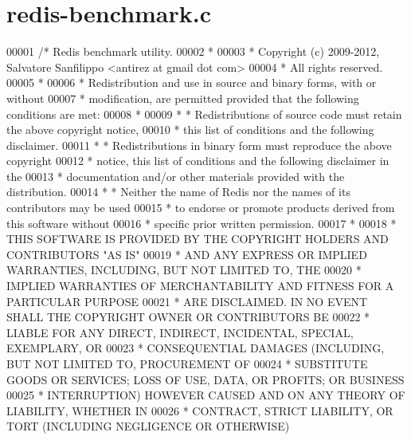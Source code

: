 \hypertarget{redis-benchmark_8c_source}{}\section{redis-\/benchmark.c}
\label{redis-benchmark_8c_source}

\begin{DoxyCode}
00001 \textcolor{comment}{/* Redis benchmark utility.}
00002 \textcolor{comment}{ *}
00003 \textcolor{comment}{ * Copyright (c) 2009-2012, Salvatore Sanfilippo <antirez at gmail dot com>}
00004 \textcolor{comment}{ * All rights reserved.}
00005 \textcolor{comment}{ *}
00006 \textcolor{comment}{ * Redistribution and use in source and binary forms, with or without}
00007 \textcolor{comment}{ * modification, are permitted provided that the following conditions are met:}
00008 \textcolor{comment}{ *}
00009 \textcolor{comment}{ *   * Redistributions of source code must retain the above copyright notice,}
00010 \textcolor{comment}{ *     this list of conditions and the following disclaimer.}
00011 \textcolor{comment}{ *   * Redistributions in binary form must reproduce the above copyright}
00012 \textcolor{comment}{ *     notice, this list of conditions and the following disclaimer in the}
00013 \textcolor{comment}{ *     documentation and/or other materials provided with the distribution.}
00014 \textcolor{comment}{ *   * Neither the name of Redis nor the names of its contributors may be used}
00015 \textcolor{comment}{ *     to endorse or promote products derived from this software without}
00016 \textcolor{comment}{ *     specific prior written permission.}
00017 \textcolor{comment}{ *}
00018 \textcolor{comment}{ * THIS SOFTWARE IS PROVIDED BY THE COPYRIGHT HOLDERS AND CONTRIBUTORS "AS IS"}
00019 \textcolor{comment}{ * AND ANY EXPRESS OR IMPLIED WARRANTIES, INCLUDING, BUT NOT LIMITED TO, THE}
00020 \textcolor{comment}{ * IMPLIED WARRANTIES OF MERCHANTABILITY AND FITNESS FOR A PARTICULAR PURPOSE}
00021 \textcolor{comment}{ * ARE DISCLAIMED. IN NO EVENT SHALL THE COPYRIGHT OWNER OR CONTRIBUTORS BE}
00022 \textcolor{comment}{ * LIABLE FOR ANY DIRECT, INDIRECT, INCIDENTAL, SPECIAL, EXEMPLARY, OR}
00023 \textcolor{comment}{ * CONSEQUENTIAL DAMAGES (INCLUDING, BUT NOT LIMITED TO, PROCUREMENT OF}
00024 \textcolor{comment}{ * SUBSTITUTE GOODS OR SERVICES; LOSS OF USE, DATA, OR PROFITS; OR BUSINESS}
00025 \textcolor{comment}{ * INTERRUPTION) HOWEVER CAUSED AND ON ANY THEORY OF LIABILITY, WHETHER IN}
00026 \textcolor{comment}{ * CONTRACT, STRICT LIABILITY, OR TORT (INCLUDING NEGLIGENCE OR OTHERWISE)}

\end{DoxyCode}
